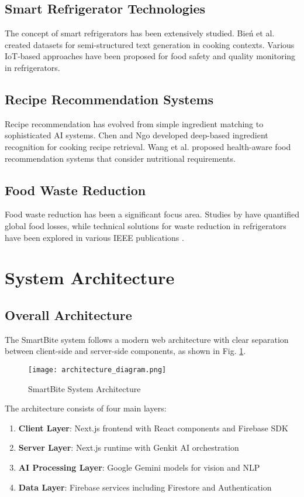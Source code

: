 \documentclass[conference]{IEEEtran}
\begin{document}
\subsection{Smart Refrigerator Technologies}
The concept of smart refrigerators has been extensively studied. Bie\'n et al. \cite{bien2020recipenlg} created datasets for semi-structured text generation in cooking contexts. Various IoT-based approaches \cite{bouzembrak2019internet} have been proposed for food safety and quality monitoring in refrigerators.

\subsection{Recipe Recommendation Systems}
Recipe recommendation has evolved from simple ingredient matching to sophisticated AI systems. Chen and Ngo \cite{chen2016deep} developed deep-based ingredient recognition for cooking recipe retrieval. Wang et al. \cite{wang2021market2dish} proposed health-aware food recommendation systems that consider nutritional requirements.

\subsection{Food Waste Reduction}
Food waste reduction has been a significant focus area. Studies by \cite{gustavsson2011global} have quantified global food losses, while technical solutions for waste reduction in refrigerators have been explored in various IEEE publications \cite{ieee9792896}.

\section{System Architecture}

\subsection{Overall Architecture}
The SmartBite system follows a modern web architecture with clear separation between client-side and server-side components, as shown in Fig. \ref{fig:architecture}.

\begin{figure}[htbp]
\centering
\texttt{[image: architecture\_diagram.png]}
\caption{SmartBite System Architecture}
\label{fig:architecture}
\end{figure}

The architecture consists of four main layers:
\begin{enumerate}
    \item \textbf{Client Layer}: Next.js frontend with React components and Firebase SDK
    \item \textbf{Server Layer}: Next.js runtime with Genkit AI orchestration
    \item \textbf{AI Processing Layer}: Google Gemini models for vision and NLP
    \item \textbf{Data Layer}: Firebase services including Firestore and Authentication
\end{enumerate}
\end{document}
